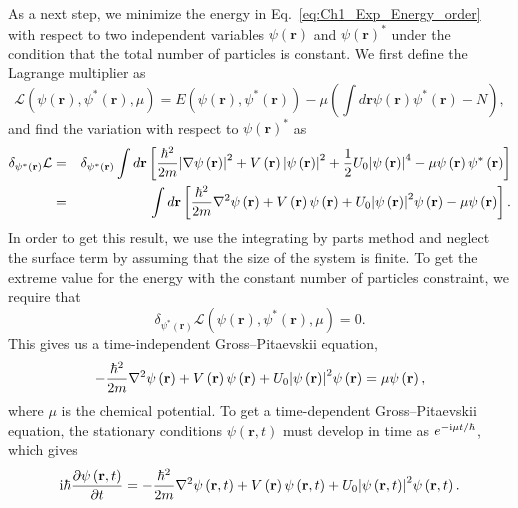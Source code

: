 As a next step, we minimize the energy in Eq.~\eqref{eq:Ch1_Exp_Energy_order} with respect to two independent variables $\psi\left(\mathbf{r}\right)$ and $\psi\left( \mathbf{r}\right)^*$ under the condition that the total number of particles is constant.
We first define the Lagrange multiplier as
%
\begin{equation}
    \mathcal{L}\left(\psi\left(\mathbf{r}\right),\psi^*\left(\mathbf{r}\right),\mu\right) = E\left(\psi\left(\mathbf{r}\right),\psi^*\left(\mathbf{r}\right)\right)-\mu \left(\int d\mathbf{r} \psi\left(\mathbf{r}\right) \psi^*\left(\mathbf{r}\right) -N \right),
    \label{eq:Ch1_Mulipler}
\end{equation}
%
and find the variation with respect to $\psi\left(\mathbf{r}\right)^*$ as
%
\begin{eqnarray}
        \delta_{\psi^*\left(\mathbf{r}\right)} \mathcal{L} &=& \delta_{\psi^*\left(\mathbf{r}\right)}\int d\mathbf{r} \left[ \frac{\hbar^2}{2m}\abs{\nabla \psi\left(\mathbf{r} \right)}^2 + V \left(\mathbf{r}\right) \abs{\psi\left(\mathbf{r}\right)}^2 + \frac{1}{2} U_0 \abs{\psi\left(\mathbf{r}\right)}^4 - \mu \psi\left(\mathbf{r}\right) \psi^*\left(\mathbf{r}\right)\right] \nonumber \\
        &=&  \int d\mathbf{r} \left[ \frac{\hbar^2}{2m}\nabla^2 \psi\left(\mathbf{r} \right) + V \left(\mathbf{r}\right) \psi\left(\mathbf{r}\right) +  U_0 \abs{\psi\left(\mathbf{r}\right)}^2 \psi\left(\mathbf{r}\right)- \mu \psi\left(\mathbf{r}\right) \right].
        \label{eq:Ch1_Mulipler2}
\end{eqnarray}
%
In order to get this result, we use the integrating by parts method and neglect the surface term by assuming that the size of the system is finite.
To get the extreme value for the energy with the constant number of particles constraint, we require that
%
\begin{equation}
     \delta_{\psi^*\left(\mathbf{r}\right)}\mathcal{L}\left(\psi\left(\mathbf{r}\right),\psi^*\left(\mathbf{r}\right),\mu\right) = 0.
\end{equation}
%
This gives us a time-independent Gross--Pitaevskii equation,
%
\begin{equation}
    -\frac{\hbar^2}{2m}\nabla^2 \psi\left(\mathbf{r}\right) + V\left(\mathbf{r}\right) \psi\left(\mathbf{r}\right) + U_0 \abs{\psi\left(\mathbf{r}\right)}^2 \psi\left(\mathbf{r}\right) = \mu \psi\left(\mathbf{r}\right),
    \label{eq:Ch1_Gross_Pitaevskii_t_independent}
\end{equation}
%
where $\mu$ is the chemical potential.
To get a time-dependent Gross--Pitaevskii equation, the stationary conditions $\psi\left(\mathbf{r},t\right)$ must develop in time as $e^{-\mathrm{i}\mu t/\hbar}$, which gives
%
\begin{equation}
    \mathrm{i}\hbar \frac{\partial \psi \left(\mathbf{r},t\right)}{\partial t} = -\frac{\hbar^2}{2m} \nabla^2 \psi\left(\mathbf{r},t \right) + V \left(\mathbf{r}\right) \psi\left(\mathbf{r},t\right) + U_0 \abs{\psi\left(\mathbf{r},t\right)}^2 \psi\left(\mathbf{r},t\right).
    \label{eq:Ch1_GP_time_dep}
\end{equation}
%

